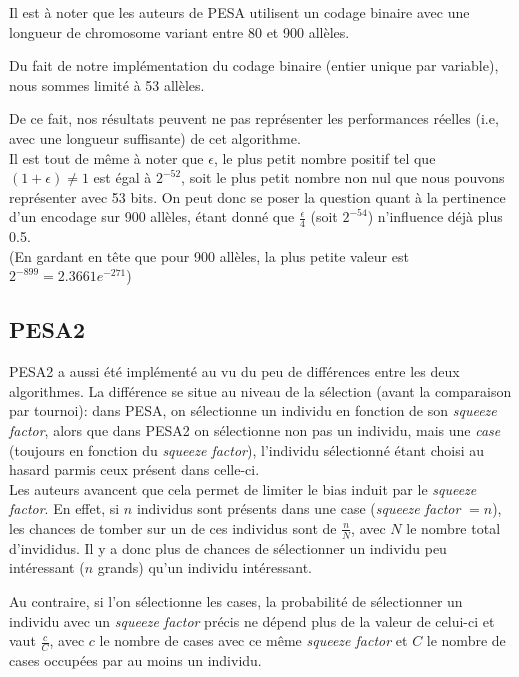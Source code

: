 \documentclass[12pt]{article}
\begin{document}
Il est à noter que les auteurs de PESA utilisent un codage binaire
avec une longueur de chromosome variant entre 80 et 900 allèles.

Du fait de notre implémentation du codage binaire (entier unique par
variable), nous sommes limité à 53 allèles.

De ce fait, nos résultats peuvent ne pas représenter les performances
réelles (i.e, avec une longueur suffisante) de cet algorithme.\\

Il est tout de même à noter que $\epsilon$, le plus petit nombre
positif tel que $(1 + \epsilon) \neq 1$ est égal à $2^{-52}$, soit le
plus petit nombre non nul que nous pouvons représenter avec 53
bits. On peut donc se poser la question quant à la pertinence d'un
encodage sur 900 allèles, étant donné que $\frac{\epsilon}{4}$ (soit $2^{-54}$)
n'influence déjà plus 0.5.\\
(En gardant en tête que pour 900 allèles, la plus petite valeur est
$2^{-899 } = 2.3661e^{-271}$)

\subsection{PESA2}

PESA2 a aussi été implémenté au vu du peu de différences entre les
deux algorithmes. La différence se situe au niveau de la sélection
(avant la comparaison par tournoi): dans PESA, on sélectionne un
individu en fonction de son \textit{squeeze factor}, alors que dans
PESA2 on sélectionne non pas un individu, mais une \textit{case}
(toujours en fonction du \textit{squeeze factor}), l'individu
sélectionné étant choisi au hasard parmis ceux présent dans
celle-ci.\\

Les auteurs avancent que cela permet de limiter le bias induit par le
\textit{squeeze factor}. En effet, si $n$ individus sont présents dans
une case (\textit{squeeze factor} $= n$), les chances de tomber sur un
de ces individus sont de $\frac{n}{N}$, avec $N$ le nombre total
d'invididus. Il y a donc plus de chances de sélectionner un individu
peu intéressant ($n$ grands) qu'un individu intéressant.

Au contraire, si l'on sélectionne les cases, la probabilité de
sélectionner un individu avec un \textit{squeeze factor} précis ne
dépend plus de la valeur de celui-ci et vaut $\frac{c}{C}$, avec $c$
le nombre de cases avec ce même \textit{squeeze factor} et $C$ le
nombre de cases occupées par au moins un individu.
\end{document}
